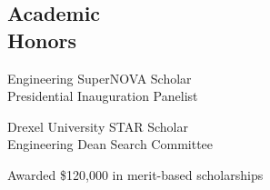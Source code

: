\documentclass[margin]{res}
\begin{document}
\begin{resume}
\section{Academic \\ Honors}
\begin{minipage}[t]{0.5\linewidth}
Engineering SuperNOVA Scholar \\
Presidential Inauguration Panelist \\
\end{minipage}
\begin{minipage}[t]{0.5\linewidth}
Drexel University STAR Scholar \\
Engineering Dean Search Committee \\ 
\end{minipage}

\vspace{-5mm}
{\centering Awarded \$120,000 in merit-based scholarships

}


\end{resume}
\end{document}
